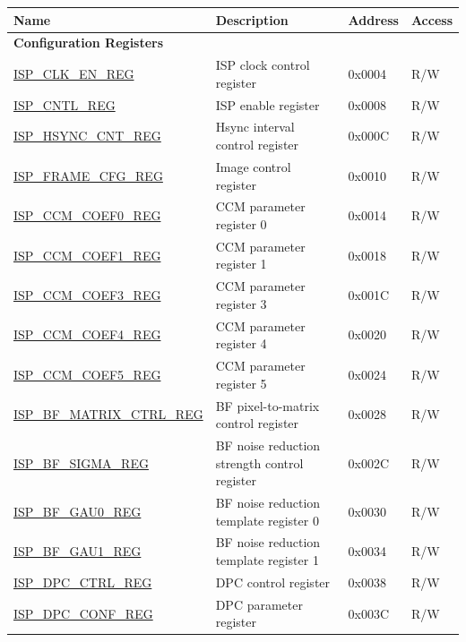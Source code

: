 \begin{longtable}{ | p{6cm} | p{7.2cm} | p{1.3cm} | p{1cm} | }
\hline\rowcolor{lightgray}
{\bfseries Name} & {\bfseries Description} &  {\bfseries Address} & {\bfseries Access} \\ \hline
\endhead
\multicolumn{4}{|l|}{\textbf{Configuration Registers}} \\ \hline
\hyperref[regdesc:ISPCLKENREG]{ISP\_CLK\_EN\_REG} & ISP clock control register & 0x0004 & R/W \\ \hline
\hyperref[regdesc:ISPCNTLREG]{ISP\_CNTL\_REG} & ISP enable register & 0x0008 & R/W \\ \hline
\hyperref[regdesc:ISPHSYNCCNTREG]{ISP\_HSYNC\_CNT\_REG} & Hsync interval control register & 0x000C & R/W \\ \hline
\hyperref[regdesc:ISPFRAMECFGREG]{ISP\_FRAME\_CFG\_REG} & Image control register & 0x0010 & R/W \\ \hline
\hyperref[regdesc:ISPCCMCOEF0REG]{ISP\_CCM\_COEF0\_REG} & CCM parameter register 0 & 0x0014 & R/W \\ \hline
\hyperref[regdesc:ISPCCMCOEF1REG]{ISP\_CCM\_COEF1\_REG} & CCM parameter register 1 & 0x0018 & R/W \\ \hline
\hyperref[regdesc:ISPCCMCOEF3REG]{ISP\_CCM\_COEF3\_REG} & CCM parameter register 3 & 0x001C & R/W \\ \hline
\hyperref[regdesc:ISPCCMCOEF4REG]{ISP\_CCM\_COEF4\_REG} & CCM parameter register 4 & 0x0020 & R/W \\ \hline
\hyperref[regdesc:ISPCCMCOEF5REG]{ISP\_CCM\_COEF5\_REG} & CCM parameter register 5 & 0x0024 & R/W \\ \hline
\hyperref[regdesc:ISPBFMATRIXCTRLREG]{ISP\_BF\_MATRIX\_CTRL\_REG} & BF pixel-to-matrix control register & 0x0028 & R/W \\ \hline
\hyperref[regdesc:ISPBFSIGMAREG]{ISP\_BF\_SIGMA\_REG} & BF noise reduction strength control register & 0x002C & R/W \\ \hline
\hyperref[regdesc:ISPBFGAU0REG]{ISP\_BF\_GAU0\_REG} & BF noise reduction template register 0 & 0x0030 & R/W \\ \hline
\hyperref[regdesc:ISPBFGAU1REG]{ISP\_BF\_GAU1\_REG} & BF noise reduction template register 1 & 0x0034 & R/W \\ \hline
\hyperref[regdesc:ISPDPCCTRLREG]{ISP\_DPC\_CTRL\_REG} & DPC control register & 0x0038 & R/W \\ \hline
\hyperref[regdesc:ISPDPCCONFREG]{ISP\_DPC\_CONF\_REG} & DPC parameter register & 0x003C & R/W \\ \hline

\end{longtable}
